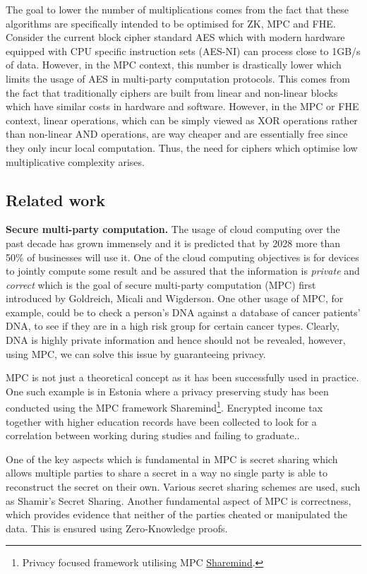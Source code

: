 \documentclass{Resources/UoBLab1}
\theoremstyle{definition}
\begin{document}
The goal to lower the number of multiplications comes from the fact that these algorithms are specifically intended to be optimised for ZK, MPC and FHE. Consider the current block cipher standard AES which with modern hardware equipped with CPU specific instruction sets (AES-NI) can process close to 1GB/s\cite{AESNI} of data. However, in the MPC context, this number is drastically lower which limits the usage of AES in multi-party computation protocols\cite{AESInMPC}. This comes from the fact that traditionally ciphers are built from linear and non-linear blocks which have similar costs in hardware and software. However, in the MPC or FHE context, linear operations, which can be simply viewed as XOR operations rather than non-linear AND operations, are way cheaper and are essentially free since they only incur local computation. Thus, the need for ciphers which optimise low multiplicative complexity arises.

\subsection{Related work}
\textbf{Secure multi-party computation.} The usage of cloud computing over the past decade has grown immensely and it is predicted that by 2028 more than 50\% of businesses will use it\cite{CloudTrend}. One of the cloud computing objectives is for devices to jointly compute some result and be assured that the information is \textit{private} and \textit{correct} which is the goal of secure multi-party computation (MPC) first introduced by Goldreich, Micali and Wigderson\cite{MPCFirst}. One other usage of MPC, for example, could be to check a person's DNA against a database of cancer patients' DNA, to see if they are in a high risk group for certain cancer types. Clearly, DNA is highly private information and hence should not be revealed, however, using MPC, we can solve this issue by guaranteeing privacy.

MPC is not just a theoretical concept as it has been successfully used in practice. One such example is in Estonia where a privacy preserving study has been conducted using the MPC framework Sharemind\footnote{Privacy focused framework utilising MPC \href{https://sharemind.cyber.ee}{Sharemind}.}. Encrypted income tax together with higher education records have been collected to look for a correlation between working during studies and failing to graduate.\cite{Estija}.

One of the key aspects which is fundamental in MPC is secret sharing which allows multiple parties to share a secret in a way no single party is able to reconstruct the secret on their own. Various secret sharing schemes are used, such as Shamir's Secret Sharing\cite{Shamir}. Another fundamental aspect of MPC is correctness, which provides evidence that neither of the parties cheated or manipulated the data. This is ensured using Zero-Knowledge proofs.\medskip
\end{document}
